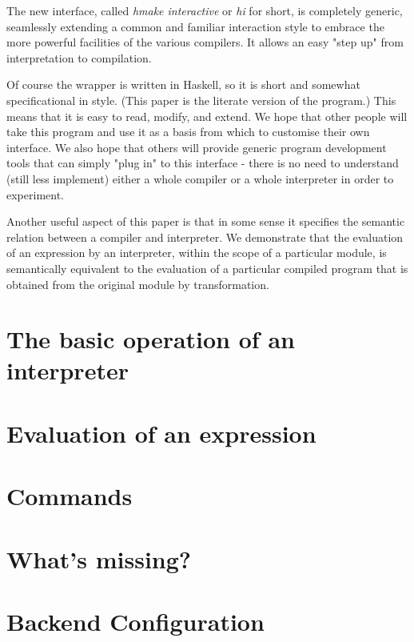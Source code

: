 \documentclass[a4paper]{article}
\begin{document}
The new interface, called {\em hmake interactive} or {\em hi}
for short, is completely generic, seamlessly extending a common and
familiar interaction style to embrace the more powerful facilities of
the various compilers.  It allows an easy "step up" from interpretation
to compilation.

Of course the wrapper is written in Haskell, so it is short and
somewhat specificational in style.  (This paper is the literate
version of the program.)  This means that it is easy to read, modify,
and extend.  We hope that other people will take this program and
use it as a basis from which to customise their own interface.
We also hope that others will provide generic program development
tools that can simply "plug in" to this interface - there is no need
to understand (still less implement) either a whole compiler or a
whole interpreter in order to experiment.

Another useful aspect of this paper is that in some sense it
specifies the semantic relation between a compiler and interpreter.
We demonstrate that the evaluation of an expression by an interpreter,
within the scope of a particular module, is semantically equivalent
to the evaluation of a particular compiled program that is obtained
from the original module by transformation.




\section*{The basic operation of an interpreter}


\section*{Evaluation of an expression}


\section*{Commands}


\section*{What's missing?}


\section*{Backend Configuration}
\end{document}
